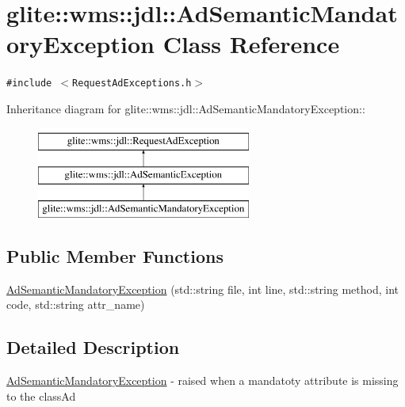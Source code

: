 \hypertarget{classglite_1_1wms_1_1jdl_1_1AdSemanticMandatoryException}{
\section{glite::wms::jdl::Ad\-Semantic\-Mandatory\-Exception Class Reference}
\label{classglite_1_1wms_1_1jdl_1_1AdSemanticMandatoryException}
}
{\tt \#include $<$Request\-Ad\-Exceptions.h$>$}

Inheritance diagram for glite::wms::jdl::Ad\-Semantic\-Mandatory\-Exception::\begin{figure}[H]
\begin{center}
\leavevmode
\includegraphics[height=3cm]{classglite_1_1wms_1_1jdl_1_1AdSemanticMandatoryException}
\end{center}
\end{figure}
\subsection*{Public Member Functions}
\begin{CompactItemize}
\item 
\hyperlink{classglite_1_1wms_1_1jdl_1_1AdSemanticMandatoryException_a0}{Ad\-Semantic\-Mandatory\-Exception} (std::string file, int line, std::string method, int code, std::string attr\_\-name)
\end{CompactItemize}


\subsection{Detailed Description}
\hyperlink{classglite_1_1wms_1_1jdl_1_1AdSemanticMandatoryException}{Ad\-Semantic\-Mandatory\-Exception} - raised when a mandatoty attribute is missing to the class\-Ad 



